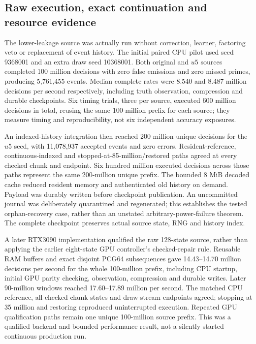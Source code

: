 \subsection{Raw execution, exact continuation and resource evidence}

The lower-leakage source was actually run without correction, learner, factoring veto or replacement of event history. The initial paired CPU pilot used seed 9368001 and an extra draw seed 10368001. Both original and $u5$ sources completed 100 million decisions with zero false emissions and zero missed primes, producing 5,761,455 events. Median complete rates were 8.540 and 8.487 million decisions per second respectively, including truth observation, compression and durable checkpoints. Six timing trials, three per source, executed 600 million decisions in total, reusing the same 100-million prefix for each source; they measure timing and reproducibility, not six independent accuracy exposures.

An indexed-history integration then reached 200 million unique decisions for the $u5$ seed, with 11,078,937 accepted events and zero errors. Resident-reference, continuous-indexed and stopped-at-85-million/restored paths agreed at every checked chunk and endpoint. Six hundred million executed decisions across those paths represent the same 200-million unique prefix. The bounded 8 MiB decoded cache reduced resident memory and authenticated old history on demand. Payload was durably written before checkpoint publication. An uncommitted journal was deliberately quarantined and regenerated; this establishes the tested orphan-recovery case, rather than an unstated arbitrary-power-failure theorem. The complete checkpoint preserves actual source state, RNG and history index.

A later RTX3090 implementation qualified the raw 128-state source, rather than applying the earlier eight-state GPU controller's checked-repair rule. Reusable RAM buffers and exact disjoint PCG64 subsequences gave 14.43--14.70 million decisions per second for the whole 100-million prefix, including CPU startup, initial GPU parity checking, observation, compression and durable writes. Later 90-million windows reached 17.60--17.89 million per second. The matched CPU reference, all checked chunk states and draw-stream endpoints agreed; stopping at 35 million and restoring reproduced uninterrupted execution. Repeated GPU qualification paths remain one unique 100-million source prefix. This was a qualified backend and bounded performance result, not a silently started continuous production run.

